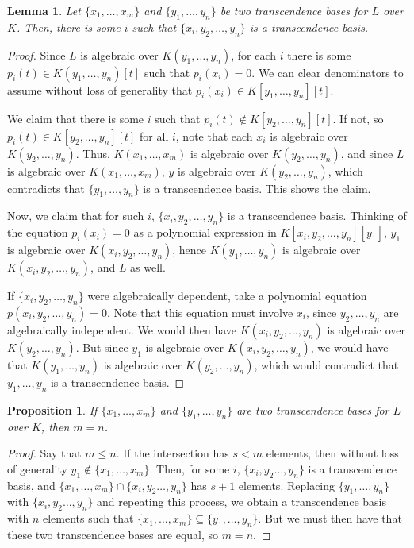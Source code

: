 \documentclass{amsart}[12pt]
\numberwithin{equation}{section}
\theoremstyle{plain} %
\newtheorem{lem}[equation]{Lemma}
\newtheorem{prop}[equation]{Proposition}
\theoremstyle{definition}
\theoremstyle{remark}
\begin{document}
\begin{lem} Let $\{x_1,\dots,x_m\}$ and $\{y_1,\dots,y_n\}$ be two transcendence bases for $L$ over $K$. Then, there is some $i$ such that $\{x_i,y_2,\dots,y_n\}$ is a transcendence basis.
\end{lem}
\begin{proof} Since $L$ is algebraic over $K(y_1,\dots,y_n)$, for each $i$ there is some $p_i(t)\in K(y_1,\dots,y_n)[t]$ such that $p_i(x_i)=0$. We can clear denominators to assume without loss of generality that $p_i(x_i)\in K[y_1,\dots,y_n][t]$. 

We claim that there is some $i$ such that $p_i(t) \notin K[y_2,\dots,y_n][t]$. If not, so $p_i(t) \in K[y_2,\dots,y_n][t]$ for all $i$, note that each $x_i$ is algebraic over $K(y_2,\dots,y_n)$.  Thus, $K(x_1,\dots,x_m)$ is algebraic over $K(y_2,\dots,y_n)$, and since $L$ is algebraic over $K(x_1,\dots,x_m)$, $y$ is algebraic over $K(y_2,\dots,y_n)$, which contradicts that $\{y_1,\dots,y_n\}$ is a transcendence basis. This shows the claim.

Now, we claim that for such $i$, $\{x_i,y_2,\dots,y_n\}$ is a transcendence basis. Thinking of the equation $p_i(x_i)=0$ as a polynomial expression in $K[x_i,y_2,\dots,y_n][y_1]$, $y_1$ is algebraic over $K(x_i,y_2,\dots,y_n)$, hence $K(y_1,\dots,y_n)$ is algebraic over $K(x_i,y_2,\dots,y_n)$, and $L$ as well.

If $\{x_i,y_2,\dots,y_n\}$ were algebraically dependent, take a polynomial equation $p(x_i,y_2,\dots,y_n)=0$. Note that this equation must involve $x_i$, since $y_2,\dots,y_n$ are algebraically independent. We would then have $K(x_i,y_2,\dots,y_n)$ is algebraic over $K(y_2,\dots,y_n)$. But since  $y_1$ is algebraic over $K(x_i,y_2,\dots,y_n)$, we would have that $K(y_1,\dots,y_n)$ is algebraic over $K(y_2,\dots,y_n)$, which would contradict that $y_1,\dots,y_n$ is a transcendence basis.
\end{proof}

\begin{prop} If $\{x_1,\dots,x_m\}$ and $\{y_1,\dots,y_n\}$ are two transcendence bases for $L$ over $K$, then $m=n$.
\end{prop} 
\begin{proof} Say that $m\leq n$.  If the intersection has $s<m$ elements, then without loss of generality $y_1\notin \{x_1,\dots,x_m\}$. Then, for some $i$,  $\{x_i, y_2\dots,y_n\}$ is a transcendence basis, and $\{x_1,\dots,x_m\} \cap \{x_i, y_2\dots,y_n\}$ has $s+1$ elements. Replacing $\{y_1,\dots,y_n\}$ with  $\{x_i, y_2\dots,y_n\}$ and repeating this process, we obtain a transcendence basis with $n$ elements such that $\{x_1,\dots,x_m\} \subseteq \{y_1,\dots,y_n\}$. But we must then have that these two transcendence bases are equal, so $m=n$.
\end{proof}
\end{document}

